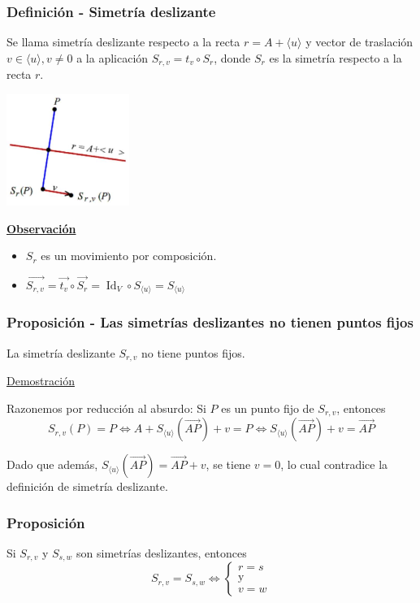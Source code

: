 \documentclass[12pt, a4paper, ones, notitlepage, openany,titlepage]{article}
\newcommand{\demostracion}{\noindent\underline{Demostración}}
\newcommand{\observacion}{\noindent\underline{\textbf{Observación}}}
\begin{document}
\subsubsection{Definición - Simetría deslizante}
Se llama simetría deslizante respecto a la recta $r=A+\langle u\rangle$ y vector de traslación $v \in\langle u\rangle, v \neq 0$ a la aplicación $S_{r, v}=t_{v} \circ S_{r}$, donde $S_{r}$ es la simetría respecto a la recta $r$.

\begin{center}
	\includegraphics[max width=4cm]{2023_04_25_301d1803eaf1bc74cfd9g-081}
\end{center}

\observacion
\begin{itemize}
\item $S_{r}$ es un movimiento por composición.
\item $\overrightarrow{S_{r,v}} = \overrightarrow{t_v} \circ \overrightarrow{S_r} = \operatorname{Id}_V \circ S_{\langle u \rangle} = S_{\langle u \rangle}$
\end{itemize}

\subsubsection{Proposición - Las simetrías deslizantes no tienen puntos fijos}
\noindent La simetría deslizante $S_{r, v}$ no tiene puntos fijos.

\demostracion

\noindent Razonemos por reducción al absurdo: Si $P$ es un punto fijo de $S_{r, v}$, entonces
$$
S_{r, v}(P)=P \Longleftrightarrow A+S_{\langle u\rangle}(\overrightarrow{A P})+v=P \Longleftrightarrow S_{\langle u\rangle}(\overrightarrow{A P})+v=\overrightarrow{A P}
$$

Dado que además, $S_{\langle u\rangle}(\overrightarrow{A P})=\overrightarrow{A P}+v$, se tiene $v=0$, lo cual contradice la definición de simetría deslizante.

\subsubsection{Proposición}
\noindent Si $S_{r,v}$ y $S_{s,w}$ son simetrías deslizantes, entonces
$$
S_{r,v} = S_{s,w} \Longleftrightarrow \begin{cases}
	r = s \\
	\text{y} \\
	v = w
\end{cases}
$$
\end{document}
